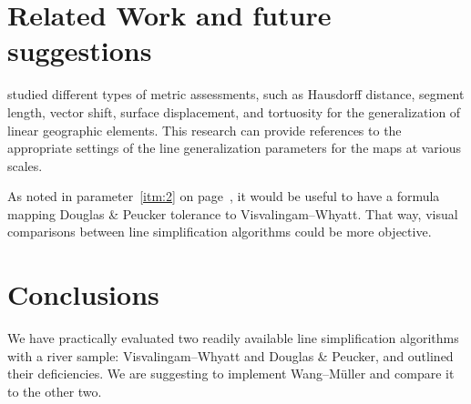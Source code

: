 \documentclass[a4paper]{article}
\newcommand{\DP}{Douglas \& Peucker}
\newcommand{\VW}{Visvalingam--Whyatt}
\newcommand{\WM}{Wang--M{\"u}ller}
\begin{document}
\section{Related Work and future suggestions}
\label{sec:related_work}

\cite{stanislawski2012automated} studied different types of metric assessments,
such as Hausdorff distance, segment length, vector shift, surface displacement,
and tortuosity for the generalization of linear geographic elements. This
research can provide references to the appropriate settings of the line
generalization parameters for the maps at various scales.

As noted in parameter~\ref{itm:2} on page~\pageref{itm:2}, it would be useful
to have a formula mapping {\DP} tolerance to {\VW}. That way, visual
comparisons between line simplification algorithms could be more objective.

\section{Conclusions}
\label{sec:conclusions}

We have practically evaluated two readily available line simplification
algorithms with a river sample: {\VW} and {\DP}, and outlined their
deficiencies. We are suggesting to implement {\WM} and compare it to the other
two.

\printbibliography

\end{document}
